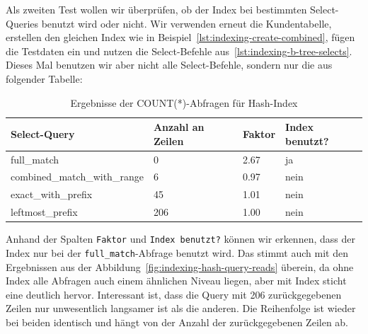 Als zweiten Test wollen wir überprüfen, ob der Index bei bestimmten Select-Queries benutzt wird oder nicht.
Wir verwenden erneut die Kundentabelle, erstellen den gleichen Index wie in Beispiel~\ref{lst:indexing-create-combined}, fügen die Testdaten ein und nutzen die Select-Befehle aus~\ref{lst:indexing-b-tree-selects}.
Dieses Mal benutzen wir aber nicht alle Select-Befehle, sondern nur die aus folgender Tabelle:

\vspace{-4pt}
\begin{table}[H]
    \centering
    \scriptsize
    \begin{tabular}{|l|l|l|l|}
        \hline
        \textbf{Select-Query} & \textbf{Anzahl an Zeilen} & \textbf{Faktor} & \textbf{Index benutzt?} \\
        \hline
        full\_match & 0 & 2.67 & ja \\
        combined\_match\_with\_range & 6 & 0.97 & nein \\
        exact\_with\_prefix & 45 & 1.01 & nein \\
        leftmost\_prefix & 206 & 1.00 & nein \\
        \hline
    \end{tabular}
    \vspace{3pt}
    \caption{Ergebnisse der COUNT(*)-Abfragen für Hash-Index}
    \label{tab:indexing_hash_count_results}
\end{table}
\vspace{-27pt}

Anhand der Spalten \texttt{Faktor} und \texttt{Index benutzt?} können wir erkennen, dass der Index nur bei der \texttt{full\_match}-Abfrage benutzt wird.
Das stimmt auch mit den Ergebnissen aus der Abbildung~\ref{fig:indexing-hash-query-reads} überein, da ohne Index alle Abfragen auch einem ähnlichen Niveau liegen, aber mit Index sticht eine deutlich hervor.
Interessant ist, dass die Query mit 206 zurückgegebenen Zeilen nur unwesentlich langsamer ist als die anderen.
Die Reihenfolge ist wieder bei beiden identisch und hängt von der Anzahl der zurückgegebenen Zeilen ab.

